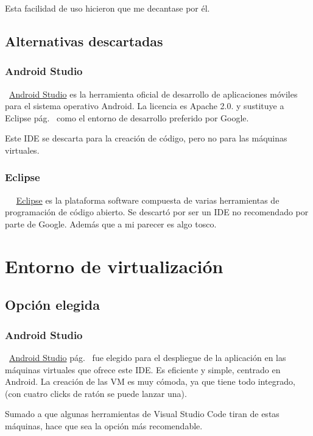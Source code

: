 Esta facilidad de uso hicieron que me decantase por él.

\subsection{Alternativas descartadas}

\subsubsection{Android Studio}\label{androidstudio}
~\href{https://developer.android.com/studio}{Android Studio} es la herramienta oficial de desarrollo de aplicaciones móviles para el sistema operativo Android. La licencia es Apache 2.0. y sustituye a Eclipse pág.~\pageref{eclipse} como el entorno de desarrollo preferido por Google.

Este IDE se descarta para la creación de código, pero no para las máquinas virtuales.

\subsubsection{Eclipse}~\label{eclipse}
~\href{https://www.eclipse.org/}{Eclipse} es la plataforma software compuesta de varias herramientas de programación de código abierto. Se descartó por ser un IDE no recomendado por parte de Google. Además que a mi parecer es algo tosco.

\section{Entorno de virtualización}

\subsection{Opción elegida}

\subsubsection{Android Studio}
~\href{https://developer.android.com/studio}{Android Studio} pág.~\pageref{androidstudio} fue elegido para el despliegue de la aplicación en las máquinas virtuales que ofrece este IDE. Es eficiente y simple, centrado en Android. La creación de las VM es muy cómoda, ya que tiene todo integrado, (con cuatro clicks de ratón se puede lanzar una).

Sumado a que algunas herramientas de Visual Studio Code tiran de estas máquinas, hace que sea la opción más recomendable.


